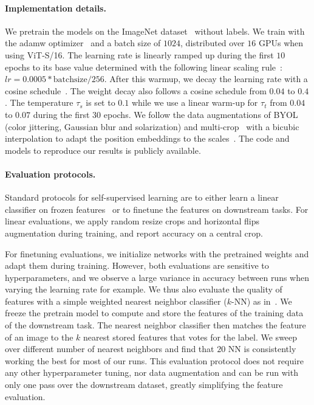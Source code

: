 \paragraph{Implementation details.} We pretrain the models on the ImageNet dataset~\cite{russakovsky2015imagenet} without labels. We train with the adamw optimizer~\cite{loshchilov2018fixing} and a batch size of $1024$, distributed over $16$ GPUs when using ViT-S/16. The learning rate is linearly ramped up during the first $10$ epochs to its base value determined with the following linear scaling rule~\cite{goyal2017accurate}: $lr = 0.0005 * \text{batchsize} / 256$. After this warmup, we decay the learning rate with a cosine schedule~\cite{loshchilov2016sgdr}. The weight decay also follows a cosine schedule from $0.04$ to $0.4$. The temperature $\tau_s$ is set to $0.1$ while we use a linear warm-up for $\tau_t$ from $0.04$ to $0.07$ during the first $30$ epochs. We follow the data augmentations of BYOL~\cite{grill2020bootstrap} (color jittering, Gaussian blur and solarization) and multi-crop~\cite{caron2020unsupervised} with a bicubic interpolation to adapt the position embeddings to the scales~\cite{dosovitskiy2020image, touvron2020training}. The code and models to reproduce our results is publicly available.

\paragraph{Evaluation protocols.} Standard protocols for self-supervised learning are to either learn a linear classifier on frozen features~\cite{zhang2016colorful,he2020momentum} or to finetune the features on downstream tasks. For linear evaluations, we apply random resize crops and horizontal flips augmentation during training, and report accuracy on a central crop.

For finetuning evaluations, we initialize networks with the pretrained weights and adapt them during training. However, both evaluations are sensitive to hyperparameters, and we observe a large variance in accuracy between runs when varying the learning rate for example. We thus also evaluate the quality of features with a simple weighted nearest neighbor classifier ($k$-NN) as in~\cite{wu2018unsupervised}. We freeze the pretrain model to compute and store the features of the training data of the downstream task. The nearest neighbor classifier then matches the feature of an image to the $k$ nearest stored features that votes for the label. We sweep over different number of nearest neighbors and find that $20$ NN is consistently working the best for most of our runs. This evaluation protocol does not require any other hyperparameter tuning, nor data augmentation and can be run with only one pass over the downstream dataset, greatly simplifying the feature evaluation.

